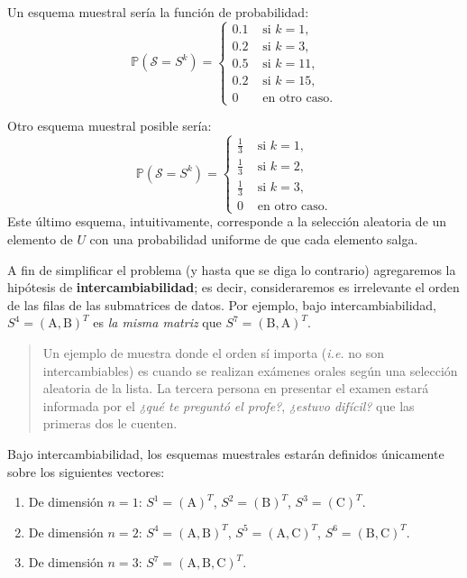 \documentclass[
]{book}
\begin{document}
Un esquema muestral sería la función de probabilidad:
\[
\mathbb{P}(\mathcal{S} = S^k) = \begin{cases}
0.1 & \text{ si } k = 1, \\
0.2 & \text{ si } k = 3, \\
0.5 & \text{ si } k = 11, \\
0.2 & \text{ si } k = 15, \\
0   & \text{ en otro caso.}
\end{cases}
\]

Otro esquema muestral posible sería:
\[
\mathbb{P}(\mathcal{S} = S^k) = \begin{cases}
\frac{1}{3} & \text{ si } k = 1, \\
\frac{1}{3} & \text{ si } k = 2, \\
\frac{1}{3} & \text{ si } k = 3, \\
0   & \text{ en otro caso.}
\end{cases}
\]
Este último esquema, intuitivamente, corresponde a la selección aleatoria de un elemento de \(U\) con una probabilidad uniforme de que cada elemento salga.

A fin de simplificar el problema (y hasta que se diga lo contrario) agregaremos la hipótesis de \textbf{intercambiabilidad}; es decir, consideraremos es irrelevante el orden de las filas de las submatrices de datos. Por ejemplo, bajo intercambiabilidad, \(S^4 = (\text{A}, \text{B})^T\) es \emph{la misma matriz} que \(S^7 = (\text{B}, \text{A})^T\).

\begin{quote}
Un ejemplo de muestra donde el orden sí importa (\emph{i.e.} no son intercambiables) es cuando se realizan exámenes orales según una selección aleatoria de la lista. La tercera persona en presentar el examen estará informada por el \emph{¿qué te preguntó el profe?}, \emph{¿estuvo difícil?} que las primeras dos le cuenten.
\end{quote}

Bajo intercambiabilidad, los esquemas muestrales estarán definidos únicamente sobre los siguientes vectores:

\begin{enumerate}
\def\labelenumi{\arabic{enumi}.}
\item
  De dimensión \(n = 1\): \(S^1 = (\text{A})^T\), \(S^2 = (\text{B})^T\), \(S^3 = (\text{C})^T\).
\item
  De dimensión \(n = 2\): \(S^4 = (\text{A}, \text{B})^T\), \(S^5 = (\text{A}, \text{C})^T\), \(S^6 = (\text{B}, \text{C})^T\).
\item
  De dimensión \(n = 3\): \(S^{7} = (\text{A}, \text{B}, \text{C})^T\).
\end{enumerate}
\end{document}
